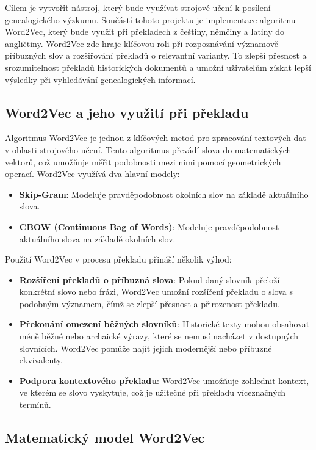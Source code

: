 \documentclass[czech, ba, kiv, he]{fasthesis}
\begin{document}
Cílem je vytvořit nástroj, který bude využívat strojové učení k posílení genealogického výzkumu. Součástí tohoto projektu je implementace algoritmu Word2Vec, který bude využit při překladech z češtiny, němčiny a latiny do angličtiny. Word2Vec zde hraje klíčovou roli při rozpoznávání významově příbuzných slov a rozšiřování překladů o relevantní varianty. To zlepší přesnost a srozumitelnost překladů historických dokumentů a umožní uživatelům získat lepší výsledky při vyhledávání genealogických informací.  

\subsection{Word2Vec a jeho využití při překladu}  

Algoritmus Word2Vec je jednou z klíčových metod pro zpracování textových dat v oblasti strojového učení. Tento algoritmus převádí slova do matematických vektorů, což umožňuje měřit podobnosti mezi nimi pomocí geometrických operací. Word2Vec využívá dva hlavní modely:  

\begin{itemize}  
    \item \textbf{Skip-Gram}: Modeluje pravděpodobnost okolních slov na základě aktuálního slova.  
    \item \textbf{CBOW (Continuous Bag of Words)}: Modeluje pravděpodobnost aktuálního slova na základě okolních slov.  
\end{itemize}  

Použití Word2Vec v procesu překladu přináší několik výhod:  

\begin{itemize}  
    \item \textbf{Rozšíření překladů o příbuzná slova}: Pokud daný slovník přeloží konkrétní slovo nebo frázi, Word2Vec umožní rozšíření překladu o slova s podobným významem, čímž se zlepší přesnost a přirozenost překladu.  
    \item \textbf{Překonání omezení běžných slovníků}: Historické texty mohou obsahovat méně běžné nebo archaické výrazy, které se nemusí nacházet v dostupných slovnících. Word2Vec pomůže najít jejich modernější nebo příbuzné ekvivalenty.  
    \item \textbf{Podpora kontextového překladu}: Word2Vec umožňuje zohlednit kontext, ve kterém se slovo vyskytuje, což je užitečné při překladu víceznačných termínů.  
\end{itemize}  

\subsection{Matematický model Word2Vec}  
\end{document}
